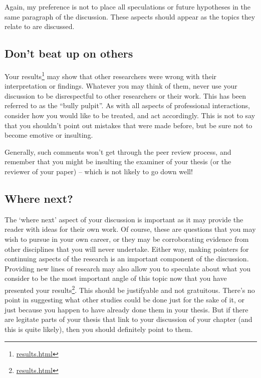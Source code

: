 \documentclass[
]{krantz}
\renewcommand{\href}[2]{#2\footnote{\url{#1}}}
\begin{document}
Again, my preference is not to place all speculations or future hypotheses in the same paragraph of the discussion. These aspects should appear as the topics they relate to are discussed.

\hypertarget{dont-beat-up-on-others}{%
\subsection{Don't beat up on others}\label{dont-beat-up-on-others}}

Your \href{results.html}{results} may show that other researchers were wrong with their interpretation or findings. Whatever you may think of them, never use your discussion to be disrespectful to other researchers or their work. This has been referred to as the ``bully pulpit''. As with all aspects of professional interactions, consider how you would like to be treated, and act accordingly. This is not to say that you shouldn't point out mistakes that were made before, but be sure not to become emotive or insulting.

Generally, such comments won't get through the peer review process, and remember that you might be insulting the examiner of your thesis (or the reviewer of your paper) -- which is not likely to go down well!

\hypertarget{where-next}{%
\subsection{Where next?}\label{where-next}}

The `where next' aspect of your discussion is important as it may provide the reader with ideas for their own work. Of course, these are questions that you may wish to pursue in your own career, or they may be corroborating evidence from other disciplines that you will never undertake. Either way, making pointers for continuing aspects of the research is an important component of the discussion. Providing new lines of research may also allow you to speculate about what you consider to be the most important angle of this topic now that you have presented your \href{results.html}{results}. This should be justifyable and not gratuitous. There's no point in suggesting what other studies could be done just for the sake of it, or just because you happen to have already done them in your thesis. But if there are legitate parts of your thesis that link to your discussion of your chapter (and this is quite likely), then you should definitely point to them.
\end{document}
